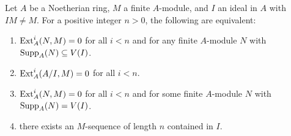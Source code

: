 \begin{theorem}
    Let $A$ be a Noetherian ring, $M$ a finite $A$-module, and $I$ an ideal in $A$ with $IM\ne M$. For a positive integer $n > 0$, the following are equivalent: 
    \begin{enumerate}[label=(\arabic*)]
        \item $\operatorname{Ext}^i_A(N, M) = 0$ for all $i < n$ and for any finite $A$-module $N$ with $\operatorname{Supp}_A(N)\subseteq V(I)$. 
        \item $\operatorname{Ext}^i_A(A/I, M) = 0$ for all $i < n$. 
        \item $\operatorname{Ext}^i_A(N, M) = 0$ for all $i < n$ and for some finite $A$-module $N$ with $\operatorname{Supp}_A(N) = V(I)$. 
        \item there exists an $M$-sequence of length $n$ contained in $I$.
    \end{enumerate}
\end{theorem}
